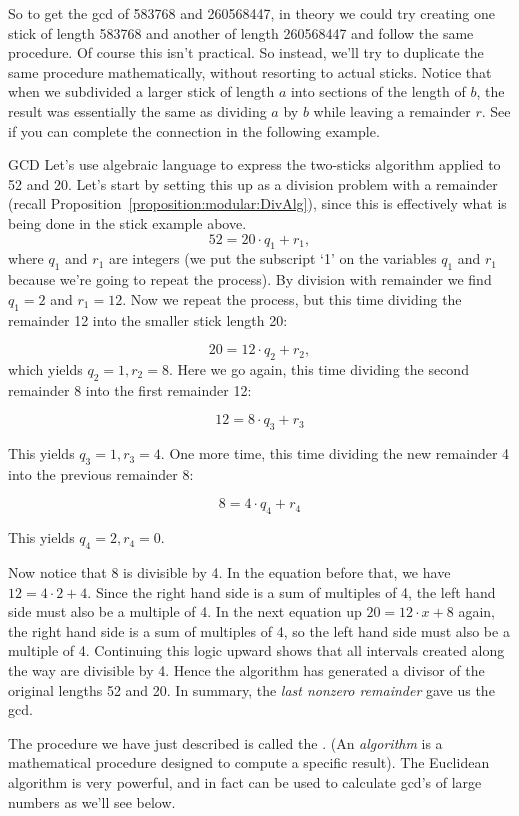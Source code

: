 So to get the gcd of 583768 and 260568447, in theory we could try creating one stick of length 583768 and another of length 260568447 and follow the same procedure. Of course this isn't practical. So instead, we'll try to duplicate the same procedure mathematically, without resorting to actual sticks.  Notice that when we subdivided a larger stick of length $a$ into sections of the length of $b$, the result was essentially the same as dividing $a$ by $b$ while leaving a remainder $r$.  See if you can complete the connection in the following example.

\begin{example}{GCD}
Let's use algebraic language to express the two-sticks algorithm applied to 52 and 20.
Let's start by setting this up as a division problem with a remainder (recall Proposition~\ref{proposition:modular:DivAlg}), since this is effectively what is being done in the stick example above.
\[ 52 = 20\cdot q_1 + r_1,\]
where $q_1$ and $r_1$ are integers  (we put the subscript `1' on the variables $q_1$ and $r_1$ because we're going to repeat the process).
By division with remainder we find $q_1=2$ and $r_1=12$.
Now we repeat the process, but this time dividing the remainder 12 into the smaller stick length 20: 

\[ 20 = 12\cdot q_2 + r_2,\]
which yields $q_2=1, r_2=8$.  Here we go again, this time dividing the second remainder 8 into the first remainder 12:

\[ 12 = 8\cdot q_3 + r_3\]

This yields $q_3=1, r_3=4$.  One more time, this time dividing the new remainder 4 into the previous remainder 8:

\[ 8 = 4\cdot q_4 + r_4\]

This yields $q_4=2, r_4=0$.  

Now notice that 8 is divisible by 4.  In the equation before that, we have $12 = 4\cdot2 + 4$.  Since the right hand side is a sum of multiples of 4, the left hand side must also be a multiple of 4.  In the next equation up $20=12\cdot x + 8$ again, the right hand side is a sum of multiples of 4, so the left hand side must also be a multiple of 4.  Continuing this logic upward shows that all intervals created along the way are divisible by 4.  Hence the algorithm has generated a divisor of the original lengths 52 and 20.  In summary, the \emph{last nonzero remainder} gave us  the gcd.

The procedure we have just described is called the . (An \emph{algorithm} is a mathematical procedure designed to compute a specific result). The Euclidean algorithm is very powerful, and in fact can be used to calculate gcd's of large numbers as we'll see below.

\end{example}

